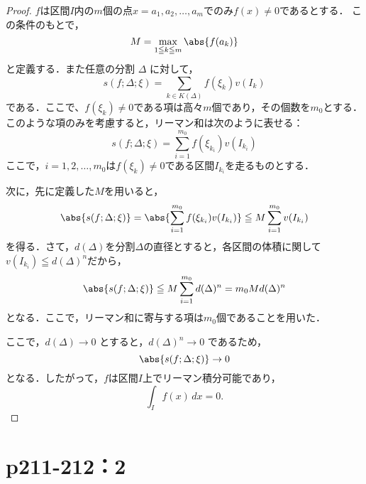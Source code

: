 \documentclass[a4paper,10pt,fleqn]{ltjsarticle}
\begin{document}
\begin{tleftbar}
    \begin{proof}
    $f$は区間$I$内の$m$個の点$x = a_1, a_2, \ldots, a_m$でのみ$f(x) \ne 0$であるとする．
    この条件のもとで，
    \[
    M = \max_{1 \leqq k \leqq m} \abs{f(a_k)}
    \]
    と定義する．また任意の分割 $\Delta$ に対して，
    \[
    s(f; \Delta; \xi) = \sum_{k \in K(\Delta)} f(\xi_k) v(I_k)
    \]
    である．ここで、$f(\xi_k) \ne 0$である項は高々$m$個であり，その個数を$m_0$とする．
    このような項のみを考慮すると，リーマン和は次のように表せる：
    \[
    s(f; \Delta; \xi) = \sum_{i=1}^{m_0} f(\xi_{k_i}) v(I_{k_i})
    \]
    ここで，$i = 1, 2, \ldots, m_0$は$f(\xi_k) \ne 0$である区間$ I_{k_i} $を走るものとする．
    
    次に，先に定義した$M$を用いると，
    \[
    \abs{s(f; \Delta; \xi)} = \abs{\sum_{i=1}^{m_0} f(\xi_{k_i}) v(I_{k_i})} \leqq M \sum_{i=1}^{m_0} v(I_{k_i})
    \]
    を得る．さて，$d(\Delta)$を分割$\Delta$の直径とすると，各区間の体積に関して$ v(I_{k_i}) \leqq d(\Delta)^n $だから，
    \[
    \abs{s(f; \Delta; \xi)} \leqq M \sum_{i=1}^{m_0} d(\Delta)^n = m_0 M d(\Delta)^n
    \]
    となる．ここで，リーマン和に寄与する項は$m_0$個であることを用いた．
    
    ここで，$d(\Delta) \to 0$ とすると，$d(\Delta)^n \to 0$ であるため，
    \[
    \abs{s(f; \Delta; \xi)} \to 0
    \]
    となる．したがって，$f$は区間$I$上でリーマン積分可能であり，
    \[
    \int_{I} f(x)\, dx = 0.
    \]
    \end{proof}
    \end{tleftbar}

    \section*{p211-212：2}
    
\end{document}
